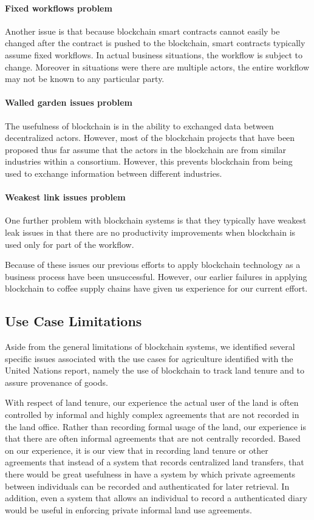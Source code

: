 \documentclass[journal]{IEEEtran}
\begin{document}
\paragraph {Fixed workflows problem} Another issue is that because blockchain
smart contracts cannot easily be changed after the contract is pushed
to the blockchain, smart contracts typically assume fixed workflows.
In actual business situations, the workflow is subject to change.
Moreover in situations were there are multiple actors, the entire
workflow may not be known to any particular party.

\paragraph {Walled garden issues problem} The usefulness of blockchain is in
the ability to exchanged data between decentralized actors.  However,
most of the blockchain projects that have been proposed thus far
assume that the actors in the blockchain are from similar industries
within a consortium.  However, this prevents blockchain from being
used to exchange information between different industries.

\paragraph {Weakest link issues problem} One further problem with blockchain
systems is that they typically have weakest leak issues in that there
are no productivity improvements when blockchain is used only for part
of the workflow.

Because of these issues our previous efforts to apply blockchain
technology as a business process have been unsuccessful.  However,
our earlier failures in applying blockchain to coffee supply chains
have given us experience for our current effort.

\subsection{Use Case Limitations}

Aside from the general limitations of blockchain systems, we
identified several specific issues associated with the use cases for
agriculture identified with the United Nations report, namely the use
of blockchain to track land tenure and to assure provenance of goods.

With respect of land tenure, our experience the actual user of the
land is often controlled by informal and highly complex agreements
that are not recorded in the land office.  Rather than recording
formal usage of the land, our experience is that there are often
informal agreements that are not centrally recorded.  Based on our
experience, it is our view that in recording land tenure or other
agreements that instead of a system that records centralized land
transfers, that there would be great usefulness in have a system by
which private agreements between individuals can be recorded and
authenticated for later retrieval.  In addition, even a system that
allows an individual to record a authenticated diary would be useful
in enforcing private informal land use agreements.
\end{document}
